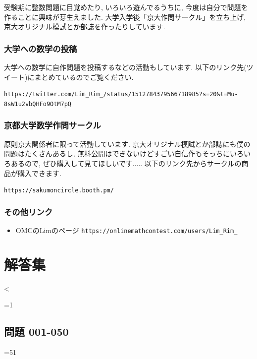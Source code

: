 \documentclass[twocolumn]{jsreport}
\begin{document}
受験期に整数問題に目覚めたり, いろいろ遊んでるうちに,
今度は自分で問題を作ることに興味が芽生えました.
大学入学後「京大作問サークル」を立ち上げ,
京大オリジナル模試とか部誌を作ったりしています.


\subsection{大学への数学の投稿}
大学への数学に自作問題を投稿するなどの活動もしています. 以下のリンク先(ツイート)にまとめているのでご覧ください.
\begin{center}
\verb|https://twitter.com/Lim_Rim_/status/1512784379566718985?s=20&t=Mu-8sW1u2vbQHFo9OtM7pQ|
\end{center}

\subsection{京都大学数学作問サークル}
原則京大関係者に限って活動しています. 京大オリジナル模試とか部誌にも僕の問題はたくさんあるし,
無料公開はできないけどすごい自信作もそっちにいろいろあるので, ぜひ購入して見てほしいです.....  以下のリンク先からサークルの商品が購入できます.
\begin{center}
\verb|https://sakumoncircle.booth.pm/|
\end{center}


\subsection{その他リンク}
\begin{itemize}
\item OMCのLimのページ \verb|https://onlinemathcontest.com/users/Lim_Rim_|
\end{itemize}






\twocolumn
\newpage
\chapter{解答集}

\setcounter{q}{0}
\loop \ifnum\value{q}<\value{qnum}


\edef\qgroup{\SMQuestionGroupFromNumber{\number\value{q}}}
\edef\qnumber{\SMQuestionNumberThreeDigits{\number\value{q}}}

\ifnum\value{q}=1
\section{問題 001-050}
\else\ifnum\value{q}=51
\newpage
\end{document}
